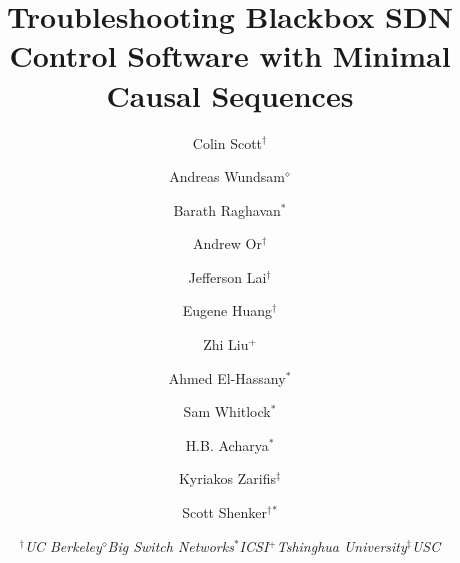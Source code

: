 \documentclass{sig-alternate-10pt}
\begin{document}
\title{Troubleshooting Blackbox SDN Control Software with Minimal Causal Sequences}

\author{Colin Scott$^\dagger$ %
\and Andreas Wundsam$^\diamond$ %
\and Barath Raghavan$^*$
\and Andrew Or$^\dagger$ %
\and Jefferson Lai$^\dagger$
\and Eugene Huang$^\dagger$ %
\and Zhi Liu$^+$
\and Ahmed El-Hassany$^*$
\and Sam Whitlock$^*$ %
\and H.B. Acharya$^*$
\and Kyriakos Zarifis$^\ddagger$ %
\and Scott Shenker$^\dagger$$^*$ %
\and {\begin{tabular}{ccccc}$^\dagger${\large\it UC Berkeley} &
$^\diamond${\large\it Big Switch Networks} & $^*${\large\it ICSI} &
$^+${\large\it Tshinghua University} & $^\ddagger${\large\it USC}\end{tabular}}
}



   \date{}
   \maketitle
   \thispagestyle{empty}

%

\abstract{{\it }}
\end{document}
